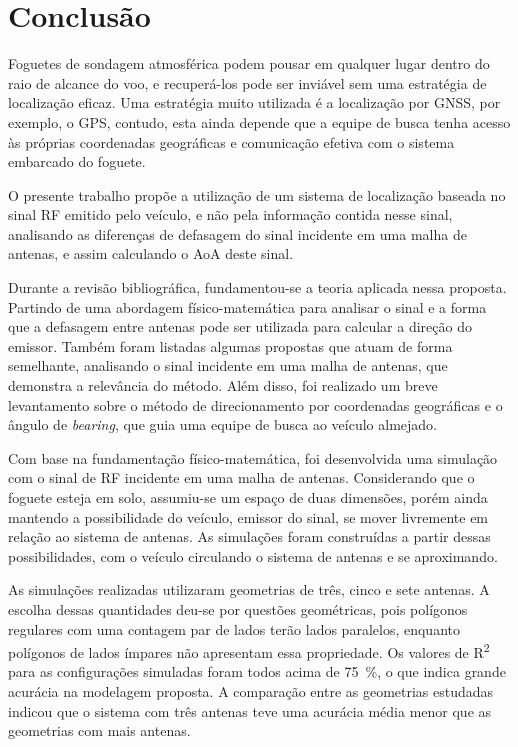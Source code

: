 \chapter{Conclusão}\label{cap:conclusao}

Foguetes de sondagem atmosférica podem pousar em qualquer lugar dentro do raio de alcance do voo, e recuperá-los pode ser inviável sem uma estratégia de localização eficaz.
Uma estratégia muito utilizada é a localização por \ac{GNSS}, por exemplo, o \ac{GPS}, contudo, esta ainda depende que a equipe de busca tenha acesso às próprias coordenadas geográficas e comunicação efetiva com o sistema embarcado do foguete.

O presente trabalho propõe a utilização de um sistema de localização baseada no sinal \ac{RF} emitido pelo veículo, e não pela informação contida nesse sinal, analisando as diferenças de defasagem do sinal incidente em uma malha de antenas, e assim calculando o \ac{AoA} deste sinal.

Durante a revisão bibliográfica, fundamentou-se a teoria aplicada nessa proposta.
Partindo de uma abordagem físico-matemática para analisar o sinal e a forma que a defasagem entre antenas pode ser utilizada para calcular a direção do emissor.
Também foram listadas algumas propostas que atuam de forma semelhante, analisando o sinal incidente em uma malha de antenas, que demonstra a relevância do método.
Além disso, foi realizado um breve levantamento sobre o método de direcionamento por coordenadas geográficas e o ângulo de \textit{bearing}, que guia uma equipe de busca ao veículo almejado.

Com base na fundamentação físico-matemática, foi desenvolvida uma simulação com o sinal de \ac{RF} incidente em uma malha de antenas.
Considerando que o foguete esteja em solo, assumiu-se um espaço de duas dimensões, porém ainda mantendo a possibilidade do veículo, emissor do sinal, se mover livremente em relação ao sistema de antenas.
As simulações foram construídas a partir dessas possibilidades, com o veículo circulando o sistema de antenas e se aproximando.

As simulações realizadas utilizaram geometrias de três, cinco e sete antenas.
A escolha dessas quantidades deu-se por questões geométricas, pois polígonos regulares com uma contagem par de lados terão lados paralelos, enquanto polígonos de lados ímpares não apresentam essa propriedade.
Os valores de R\textsuperscript{2} para as configurações simuladas foram todos acima de \qty{75}{\percent}, o que indica grande acurácia na modelagem proposta.
A comparação entre as geometrias estudadas indicou que o sistema com três antenas teve uma acurácia média menor que as geometrias com mais antenas.

